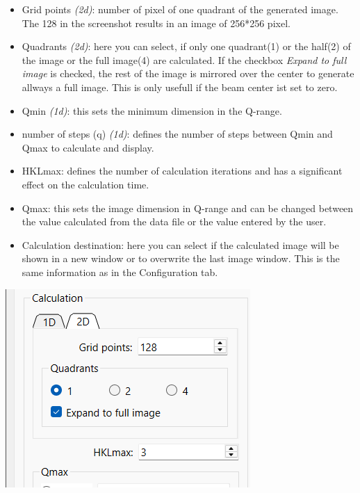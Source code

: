 \documentclass[11pt]{article} %
\begin{document}
\begin{itemize}
\begin{minipage}{0.68\textwidth}
	\begin{itemize}\itemsep0pt
	\item Grid points {\it (2d)}: number of pixel of one quadrant of the generated image. The 128 in the screenshot results in an image of 256*256 pixel.
	\item Quadrants {\it (2d)}: here you can select, if only one quadrant(1) or the half(2) of the image or the full image(4) are calculated. If the checkbox {\it Expand to full image} is checked, the rest of the image is mirrored over the center to generate allways a full image. This is only usefull if the beam center ist set to zero.
	\item Qmin {\it (1d)}: this sets the minimum dimension in the Q-range.
	\item number of steps (q) {\it (1d)}: defines the number of steps between Qmin and Qmax to calculate and display.
	\item HKLmax: defines the number of calculation iterations and has a significant effect on the calculation time.
	\item Qmax: this sets the image dimension in Q-range and can be changed between the value calculated from the data file or the value entered by the user.
	\item Calculation destination: here you can select if the calculated image will be shown in a new window or to overwrite the last image window. This is the same information as in the Configuration tab.
	\end{itemize}
\end{minipage}
\begin{minipage}{0.30\textwidth}
	\includegraphics[width=\textwidth]{gui-calculations-2d.png} \\
	

\end{minipage}
\end{itemize}
\end{document}

